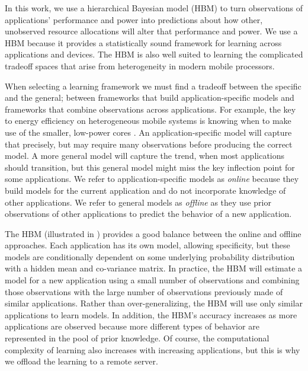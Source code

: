 In this work, we use a hierarchical Bayesian model (HBM) to turn
observations of applications' performance and power into predictions
about how other, unobserved resource allocations will alter that
performance and power.  We use a HBM because it provides a
statistically sound framework for learning across applications and
devices.  The HBM is also well suited to learning the complicated
tradeoff spaces that arise from heterogeneity in modern mobile
processors.

When selecting a learning framework we must find a tradeoff between
the specific and the general; \ie between frameworks that build
application-specific models and frameworks that combine observations
across applications.  For example, the key to energy efficiency on
heterogeneous mobile systems is knowing when to make use of the
smaller, low-power cores \cite{}.  An application-specific model will
capture that precisely, but may require many observations before
producing the correct model.  A more general model will capture the
trend, \eg when most applications should transition, but this general
model might miss the key inflection point for some applications.  We
refer to application-specific models as \emph{online} because they
build models for the current application and do not incorporate
knowledge of other applications.  We refer to general models as
\emph{offline} as they use prior observations of other applications to
predict the behavior of a new application.

The HBM (illustrated in ) provides a good balance between the online and offline
approaches. Each application has its own model, allowing specificity, but these models
are conditionally dependent on some underlying probability
distribution with a hidden mean and co-variance matrix.  In practice,
the HBM will estimate a model for a new application using a small
number of observations and combining those observations with the large
number of observations previously made of similar applications.
Rather than over-generalizing, the HBM will use only similar
applications to learn models.  In addition, the HBM's accuracy
increases as more applications are observed because more different
types of behavior are represented in the pool of prior knowledge.  Of
course, the computational complexity of learning also increases with
increasing applications, but this is why we offload the learning to a
remote server.

